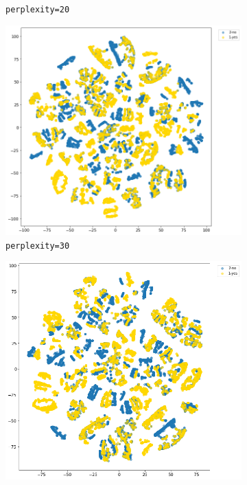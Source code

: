 \documentclass[12pt,twoside,a4paper]{article}
\begin{document}
\begin{figure}
\begin{subfigure}[b]{0.49\linewidth}
        \caption{\texttt{perplexity=20}}
    \end{subfigure}
    \begin{subfigure}[b]{0.49\linewidth}
        \centering
        \includegraphics[width=\linewidth]{images/tsne-30.png}
        \caption{\texttt{perplexity=30}}
    \end{subfigure}
    \begin{subfigure}[b]{0.49\linewidth}
        \centering
        \includegraphics[width=\linewidth]{images/tsne-40.png}

\end{subfigure}
\end{figure}
\end{document}
